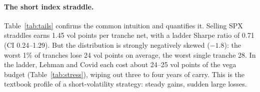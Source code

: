 \begin{table}[t]
  \centering
  \small
  \caption{Stress episodes: cumulative net P\&L of the ladder over each window, vol points per unit of vega budget. VN = vega-neutral, CW = correlation-weighted.}
  \label{tab:stress}
\end{table}

\paragraph{The short index straddle.} Table~\ref{tab:tails} confirms the common intuition and quantifies it. Selling SPX straddles earns 1.45 vol points per tranche net, with a ladder Sharpe ratio of 0.71 (CI 0.24--1.29). But the distribution is strongly negatively skewed ($-1.8$): the worst 1\% of tranches lose 24 vol points on average, the worst single tranche 28. In the ladder, Lehman and Covid each cost about 24--25 vol points of the vega budget (Table~\ref{tab:stress}), wiping out three to four years of carry. This is the textbook profile of a short-volatility strategy: steady gains, sudden large losses.

